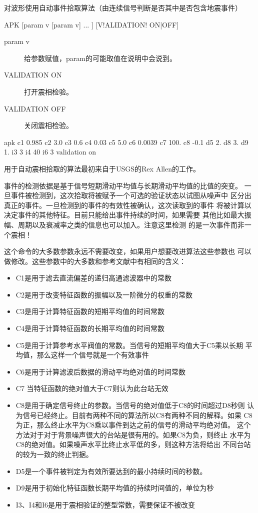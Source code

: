 \label{cmd:apk}

对波形使用自动事件拾取算法（由连续信号判断是否其中是否包含地震事件）

\begin{SACSTX}
APK [param v [param v] ... ] [V!ALIDATION! ON|OFF]
\end{SACSTX}

\begin{description}
\item [param v] 给参数赋值，param的可能取值在说明中会说到。
\item [VALIDATION ON] 打开震相检验。
\item [VALIDATION OFF] 关闭震相检验。
\end{description}

\begin{SACDFT}
apk c1 0.985 c2 3.0 c3 0.6 c4 0.03 c5 5.0 c6 0.0039 c7 100. c8 -0.1
    d5 2. d8 3. d9 1. i3 3 i4 40 i6 3 validation on
\end{SACDFT}

用于自动震相拾取的算法最初来自于USGS的Rex Allen的工作。

事件的检测依据是基于信号短期滑动平均值与长期滑动平均值的比值的突变。
一旦事件被检测到，这次拾取将被赋予一个可选的验证状态以试图从噪声中
区分出真正的事件。一旦检测到的事件的有效性被确认，这次读取到的事件
将被计算以决定事件的其他特征。目前只能给出事件持续的时间，如果需要
其他比如最大振幅、周期以及衰减率之类的信息也可以加入。注意这里检测
的是一次事件而非一个震相！

这个命令的大多数参数永远不需要改变，如果用户想要改进算法这些参数也
可以做修改。这些参数中的大多数和参考文献中有相同的含义：
\begin{itemize}
\item C1是用于滤去直流偏差的递归高通滤波器中的常数
\item C2是用于改变特征函数的振幅以及一阶微分的权重的常数
\item C3是用于计算特征函数的短期平均值的时间常数
\item C4是用于计算特征函数的长期平均值的时间常数
\item C5是用于计算参考水平阀值的常数。当信号的短期平均值大于C5乘以长期
    平均值，那么这样一个信号就是一个有效事件
\item C6是用于计算滤波后数据的滑动平均绝对值的时间常数
\item C7 当特征函数的绝对值大于C7则认为此台站无效
\item C8是用于确定信号终止的参数。当信号的绝对值低于C8的时间超过D8秒则
    认为信号已经终止。目前有两种不同的算法所以C8有两种不同的解释。如果
    C8为正，那么终止水平为C8乘以事件到达之前的信号的滑动平均绝对值。
    这个方法对于对于背景噪声很大的台站是很有用的。如果C8为负，则终止
    水平为C8的绝对值。如果噪声水平比终止水平低的多，则这种方法将给出
    不同台站的较为一致的终止判据。
\item D5是一个事件被判定为有效所要达到的最小持续时间的秒数。
\item D9是用于初始化特征函数长期平均值的持续时间值的，单位为秒
\item I3、I4和I6是用于震相验证的整型常数，需要保证不被改变
\end{itemize}

